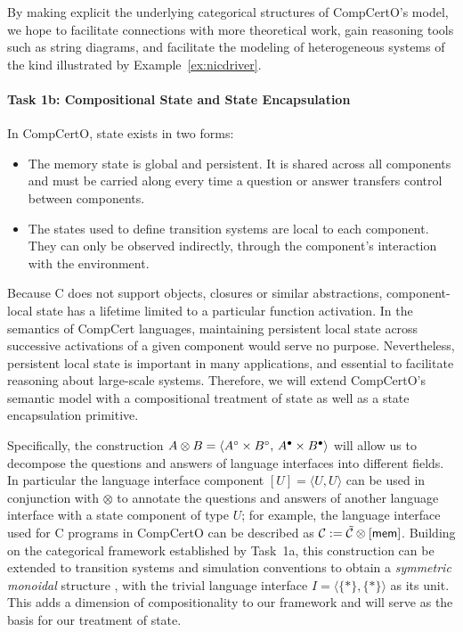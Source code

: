 By making explicit the underlying categorical structures
of CompCertO's model,
we hope to facilitate connections with more theoretical work,
gain reasoning tools such as string diagrams,
and facilitate the modeling of heterogeneous systems
of the kind illustrated by Example~\ref{ex:nicdriver}.

\vspace*{-2ex}
\paragraph*{Task 1b: Compositional State and State Encapsulation}

In CompCertO, state exists in two forms:
\begin{itemize}
  \item The memory state is global and persistent.
    It is shared across all components
    and must be carried along
    every time a question or answer transfers control
    between components.
  \item The states used to define transition systems
    are local to each component.
    They can only be observed indirectly,
    through the component's interaction with the environment.
\end{itemize}
Because C does not support objects, closures or similar abstractions,
component-local state has a lifetime limited to a particular function activation.
In the semantics of CompCert languages,
maintaining persistent local state
across successive activations of a given component
would serve no purpose.
Nevertheless,
persistent local state is important in many applications,
and essential to facilitate reasoning about large-scale systems.
Therefore,
we will extend CompCertO's semantic model
with a compositional treatment of state
as well as a state encapsulation primitive.

Specifically, the construction
$A \otimes B = \langle A^\circ \times B^\circ, \, A^\bullet \times B^\bullet \rangle$
will allow us to decompose
the questions and answers of language interfaces
into different fields.
In particular the language interface component $[U] = \langle U,U \rangle$
can be used in conjunction with $\otimes$
to annotate the questions and answers of another language interface
with a state component of type $U$;
for example,
the language interface used for C programs in CompCertO
can be described as $\mathcal{C} := \tilde{\mathcal{C}} \otimes [ \mathsf{mem} ]$.
Building on the categorical framework established by Task~1a, 
this construction can be extended
to transition systems and simulation conventions
to obtain a \emph{symmetric monoidal} structure \cite{rosetta},
with the trivial language interface $I = \langle \{*\}, \{*\} \rangle$
as its unit.
This adds a dimension of compositionality to our framework
and will serve as the basis for our treatment of state.

